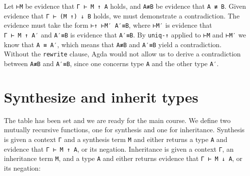 Let \texttt{⊢M} be evidence that \texttt{Γ\ ⊢\ M\ ↑\ A} holds, and
\texttt{A≢B} be evidence that \texttt{A\ ≢\ B}. Given evidence that
\texttt{Γ\ ⊢\ (M\ ↑)\ ↓\ B} holds, we must demonstrate a contradiction.
The evidence must take the form \texttt{⊢↑\ ⊢M′\ A′≡B}, where
\texttt{⊢M′} is evidence that \texttt{Γ\ ⊢\ M\ ↑\ A′} and \texttt{A′≡B}
is evidence that \texttt{A′≡B}. By \texttt{uniq-↑} applied to
\texttt{⊢M} and \texttt{⊢M′} we know that \texttt{A\ ≡\ A′}, which means
that \texttt{A≢B} and \texttt{A′≡B} yield a contradiction. Without the
\texttt{rewrite} clause, Agda would not allow us to derive a
contradiction between \texttt{A≢B} and \texttt{A′≡B}, since one concerns
type \texttt{A} and the other type \texttt{A′}.

\hypertarget{synthesize-and-inherit-types}{%
\section{Synthesize and inherit
types}\label{synthesize-and-inherit-types}}

The table has been set and we are ready for the main course. We define
two mutually recursive functions, one for synthesis and one for
inheritance. Synthesis is given a context \texttt{Γ} and a synthesis
term \texttt{M} and either returns a type \texttt{A} and evidence that
\texttt{Γ\ ⊢\ M\ ↑\ A}, or its negation. Inheritance is given a context
\texttt{Γ}, an inheritance term \texttt{M}, and a type \texttt{A} and
either returns evidence that \texttt{Γ\ ⊢\ M\ ↓\ A}, or its negation:

